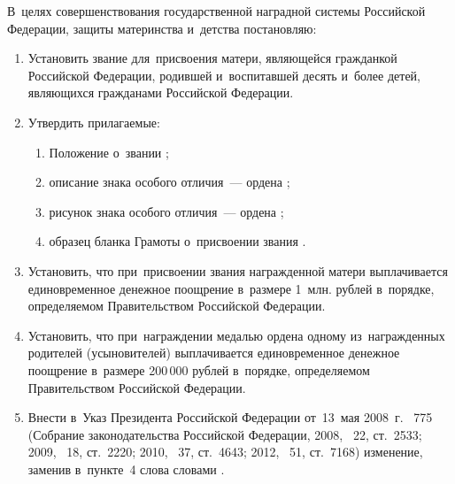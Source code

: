 \documentclass{../president-decree}
\providecommand*{\asbuk}{}
\begin{document}
	
	
	В~целях совершенствования государственной наградной системы Российской Федерации, защиты материнства и~детства постановляю:
	
	\begin{enumerate}
		\item Установить звание  для~присвоения матери, являющейся гражданкой Российской Федерации, родившей и~воспитавшей десять и~более детей, являющихся гражданами Российской Федерации.
		
		\item Утвердить прилагаемые:
		\begin{enumerate}[label=\asbuk*), ref=\asbuk*]
			\item Положение о~звании ;
			
			\item описание знака особого отличия~--- ордена ;
			
			\item рисунок знака особого отличия~--- ордена ;
			
			\item образец бланка Грамоты о~присвоении звания .
		\end{enumerate}
	
		\sloppy \item Установить, что при~присвоении звания  награжденной матери выплачивается единовременное денежное поощрение в~размере 1~млн. рублей в~порядке, определяемом Правительством Российской Федерации.
		
		\item Установить, что при~награждении медалью ордена  одному из~награжденных родителей (усыновителей) выплачивается единовременное денежное поощрение в~размере 200\,000 рублей в~порядке, определяемом Правительством Российской Федерации.
		
		\item Внести в~Указ Президента Российской Федерации от~13~мая 2008~г. \textnumero~775  (Собрание законодательства Российской Федерации, 2008, \textnumero~22, ст.~2533; 2009, \textnumero~18, ст.~2220; 2010, \textnumero~37, ст.~4643; 2012, \textnumero~51, ст.~7168) изменение, заменив в~пункте~4 слова  словами .
		

\end{enumerate}
\end{document}
